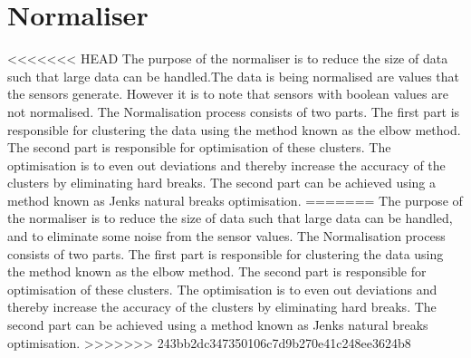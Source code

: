 \section{Normaliser}
\label{sec:normaliser}
<<<<<<< HEAD
The purpose of the normaliser is to reduce the size of data such that large data can be handled.The data is being normalised are values that the sensors generate. However it is to note that sensors with boolean values are not normalised. The Normalisation process consists of two parts. The first part is responsible for clustering the data using the method known as the elbow method. The second part is responsible for optimisation of these clusters. The optimisation is to even out deviations and thereby increase the accuracy of the clusters by eliminating hard breaks. The second part can be achieved using a method known as Jenks natural breaks optimisation.
=======
The purpose of the normaliser is to reduce the size of data such that large  data can be handled, and to eliminate some noise from the sensor values. The Normalisation process consists of two parts. The first part is responsible for clustering the data using the method known as the elbow method. The second part is responsible for optimisation of these clusters. The optimisation is to even out deviations and thereby increase the accuracy of the clusters by eliminating hard breaks. The second part can be achieved using a method known as Jenks natural breaks optimisation.
>>>>>>> 243bb2dc347350106c7d9b270e41c248ee3624b8

